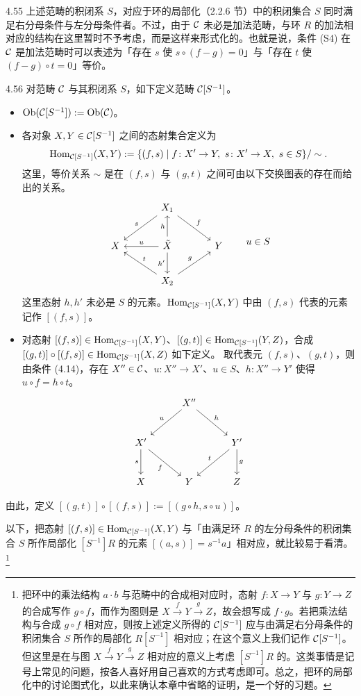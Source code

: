 \begin{remark}{4.55}
上述范畴的积闭系 $S$，对应于环的局部化（2.2.6 节）中的积闭集合 $S$ 同时满足右分母条件与左分母条件者。不过，由于 $\mathcal{C}$ 未必是加法范畴，与环 $R$ 的加法相对应的结构在这里暂时不予考虑，而是这样来形式化的。也就是说，条件 (S4) 在 $\mathcal{C}$ 是加法范畴时可以表述为「存在 $s$ 使 $s\circ(f-g)=0$」与「存在 $t$ 使 $(f-g)\circ t=0$」等价。
\end{remark}

\begin{definition}{4.56}
对范畴 $\mathcal{C}$ 与其积闭系 $S$，如下定义范畴 $\mathcal{C}[S^{-1}]$。
\begin{itemize}
  \item $\operatorname{Ob}(\mathcal{C}[S^{-1}]):=\operatorname{Ob}(\mathcal{C})$。
  \item 各对象 $X,Y\in\mathcal{C}[S^{-1}]$ 之间的态射集合定义为
        \[ \operatorname{Hom}_{\mathcal{C}[S^{-1}]}(X,Y):=\{(f,s)\mid f\colon X'\to Y,\ s\colon X'\to X,\ s\in S\}/\sim. \]
        这里，等价关系 $\sim$ 是在 $(f,s)$ 与 $(g,t)$ 之间可由以下交换图表的存在而给出的关系。
        \[\begin{tikzcd}[row sep=2.2em, column sep=3.4em]
          & X_1 \arrow[dl,"s"'] \arrow[dr,"f"] & \\
          X & \tilde{X} \arrow[l,"u"'] \arrow[u,"h"] \arrow[d,"h'"'] & Y \\
          & X_2 \arrow[ul,"t"'] \arrow[ur,"g"] &
        \end{tikzcd}\qquad u\in S\]
        这里态射 $h,h'$ 未必是 $S$ 的元素。$\operatorname{Hom}_{\mathcal{C}[S^{-1}]}(X,Y)$ 中由 $(f,s)$ 代表的元素记作 $[(f,s)]$。
  \item 对态射 $[(f,s)]\in\operatorname{Hom}_{\mathcal{C}[S^{-1}]}(X,Y)$、$[(g,t)]\in\operatorname{Hom}_{\mathcal{C}[S^{-1}]}(Y,Z)$，合成 $[(g,t)]\circ[(f,s)]\in\operatorname{Hom}_{\mathcal{C}[S^{-1}]}(X,Z)$ 如下定义。
        取代表元 $(f,s)$、$(g,t)$，则由条件 (4.14)，存在 $X''\in\mathcal{C}$、$u\colon X''\to X'$、$u\in S$、$h\colon X''\to Y'$ 使得 $u\circ f=h\circ t$。
        \[\begin{tikzcd}[row sep=2.6em, column sep=2.8em]
          & X'' \arrow[dl,"u"'] \arrow[dr,"h"] & \\
          X' \arrow[d,"s"'] \arrow[dr,"f"'] & & Y' \arrow[dl,"t"'] \arrow[d,"g"] \\
          X & Y & Z
        \end{tikzcd}\]
\end{itemize}

由此，定义 $[(g,t)]\circ[(f,s)]:=[(g\circ h,s\circ u)]$。
\end{definition}

以下，把态射 $[(f,s)]\in\operatorname{Hom}_{\mathcal{C}[S^{-1}]}(X,Y)$ 与「由满足环 $R$ 的左分母条件的积闭集合 $S$ 所作局部化 $[S^{-1}]R$ 的元素 $[(a,s)]=s^{-1}a$」相对应，就比较易于看清。\footnote{把环中的乘法结构 $a\cdot b$ 与范畴中的合成相对应时，态射 $f\colon X\to Y$ 与 $g\colon Y\to Z$ 的合成写作 $g\circ f$，而作为图则是 $X\xrightarrow{f}Y\xrightarrow{g}Z$，故会想写成 $f\cdot g$。若把乘法结构与合成 $g\circ f$ 相对应，则按上述定义所得的 $\mathcal{C}[S^{-1}]$ 应与由满足右分母条件的积闭集合 $S$ 所作的局部化 $R[S^{-1}]$ 相对应；在这个意义上我们记作 $\mathcal{C}[S^{-1}]$。但这里是在与图 $X\xrightarrow{f}Y\xrightarrow{g}Z$ 相对应的意义上考虑 $[S^{-1}]R$ 的。这类事情是记号上常见的问题，按各人喜好用自己喜欢的方式考虑即可。总之，把环的局部化中的讨论图式化，以此来确认本章中省略的证明，是一个好的习题。}

